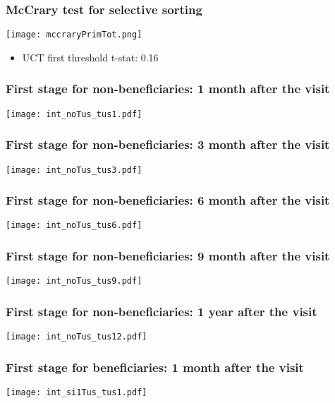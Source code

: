 \documentclass{beamer}
\begin{document}
\begin{frame}
\frametitle{McCrary test for selective sorting}
\begin{center}
	\texttt{[image: mccraryPrimTot.png]} 
	\label{mccrary}
\end{center}
\begin{itemize}
	\item UCT first threshold t-stat: 0.16
\end{itemize}
\end{frame}

\begin{frame}
\frametitle{First stage for non-beneficiaries: 1 month after the visit}
\begin{center}
	\texttt{[image: int\_noTus\_tus1.pdf]}
	\label{int_noTus_tus1}
\end{center}
\end{frame}

\begin{frame}
\frametitle{First stage for non-beneficiaries: 3 month after the visit}
\begin{center}
\texttt{[image: int\_noTus\_tus3.pdf]}
\label{int_noTus_tus3}
\end{center}
\end{frame}

\begin{frame}
\frametitle{First stage for non-beneficiaries: 6 month after the visit}
\begin{center}
\texttt{[image: int\_noTus\_tus6.pdf]}
\label{int_noTus_tus6}
\end{center}
\end{frame}

\begin{frame}
\frametitle{First stage for non-beneficiaries: 9 month after the visit}
\begin{center}
\texttt{[image: int\_noTus\_tus9.pdf]}
\label{int_noTus_tus9}
\end{center}
\end{frame}

\begin{frame}
\frametitle{First stage for non-beneficiaries: 1 year after the visit}
\begin{center}
	\texttt{[image: int\_noTus\_tus12.pdf]}
	\label{int_noTus_tus12}
\end{center}
\end{frame}

\begin{frame}
\frametitle{First stage for beneficiaries: 1 month after the visit}
\begin{center}
	\texttt{[image: int\_si1Tus\_tus1.pdf]}
	\label{int_si1Tus_tus1}
\end{center}
\end{frame}
\end{document}
